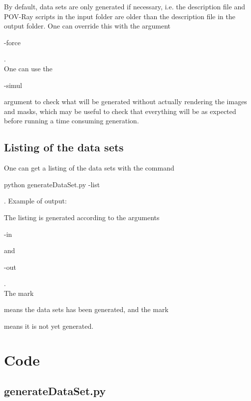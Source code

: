 By default, data sets are only generated if necessary, i.e. the description file and POV-Ray scripts in the input folder are older than the description file in the output folder. One can override this with the argument \begin{ttfamily}-force\end{ttfamily}.\\

One can use the \begin{ttfamily}-simul\end{ttfamily} argument to check what will be generated without actually rendering the images and masks, which may be useful to check that everything will be as expected before running a time consuming generation.\\

\subsection{Listing of the data sets}

One can get a listing of the data sets with the command \begin{ttfamily}python generateDataSet.py -list\end{ttfamily}. Example of output:\\
\begin{scriptsize}
\begin{ttfamily}

\end{ttfamily}
\end{scriptsize}

The listing is generated according to the arguments \begin{ttfamily}-in\end{ttfamily} and \begin{ttfamily}-out\end{ttfamily}.\\

The mark \begin{ttfamily}[*]\end{ttfamily} means the data sets has been generated, and the mark \begin{ttfamily}[ ]\end{ttfamily} means it is not yet generated.

\section{Code}

\subsection{generateDataSet.py}

